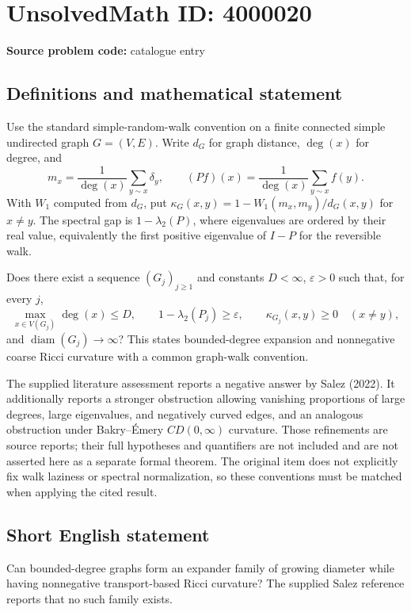 \documentclass[11pt]{article}
\begin{document}
\section*{UnsolvedMath ID: 4000020}
\textbf{Source problem code:} catalogue entry
\subsection{Definitions and mathematical statement}
Use the standard simple-random-walk convention on a finite connected simple undirected graph $G=(V,E)$. Write $d_G$ for graph distance, $\deg(x)$ for degree, and
\[
m_x=\frac1{\deg(x)}\sum_{y\sim x}\delta_y,\qquad
(Pf)(x)=\frac1{\deg(x)}\sum_{y\sim x}f(y).
\]
With $W_1$ computed from $d_G$, put $\kappa_G(x,y)=1-W_1(m_x,m_y)/d_G(x,y)$ for $x\ne y$. The spectral gap is $1-\lambda_2(P)$, where eigenvalues are ordered by their real value, equivalently the first positive eigenvalue of $I-P$ for the reversible walk.

Does there exist a sequence $(G_j)_{j\geq1}$ and constants $D<\infty$, $\varepsilon>0$ such that, for every $j$,
\[
\max_{x\in V(G_j)}\deg(x)\leq D,\qquad
1-\lambda_2(P_j)\geq\varepsilon,\qquad
\kappa_{G_j}(x,y)\geq0\quad(x\ne y),
\]
and $\operatorname{diam}(G_j)\to\infty$? This states bounded-degree expansion and nonnegative coarse Ricci curvature with a common graph-walk convention.

The supplied literature assessment reports a negative answer by Salez (2022). It additionally reports a stronger obstruction allowing vanishing proportions of large degrees, large eigenvalues, and negatively curved edges, and an analogous obstruction under Bakry--\'Emery $CD(0,\infty)$ curvature. Those refinements are source reports; their full hypotheses and quantifiers are not included and are not asserted here as a separate formal theorem. The original item does not explicitly fix walk laziness or spectral normalization, so these conventions must be matched when applying the cited result.
\subsection{Short English statement}
Can bounded-degree graphs form an expander family of growing diameter while having nonnegative transport-based Ricci curvature? The supplied Salez reference reports that no such family exists.
\end{document}
